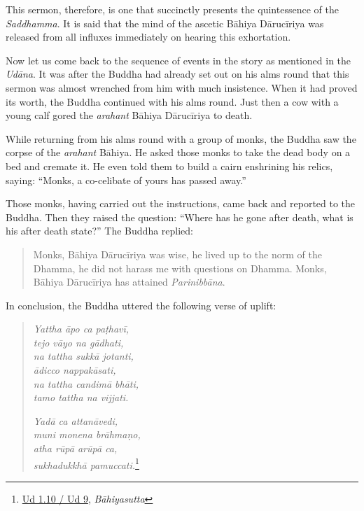 This sermon, therefore, is one that succinctly presents the quintessence of the \emph{Saddhamma}. It is said that the mind of the ascetic Bāhiya Dārucīriya was released from all influxes immediately on hearing this exhortation.

Now let us come back to the sequence of events in the story as mentioned in the \emph{Udāna}. It was after the Buddha had already set out on his alms round that this sermon was almost wrenched from him with much insistence. When it had proved its worth, the Buddha continued with his alms round. Just then a cow with a young calf gored the \emph{arahant} Bāhiya Dārucīriya to death.

While returning from his alms round with a group of monks, the Buddha saw the corpse of the \emph{arahant} Bāhiya. He asked those monks to take the dead body on a bed and cremate it. He even told them to build a cairn enshrining his relics, saying: ``Monks, a co-celibate of yours has passed away.''

Those monks, having carried out the instructions, came back and reported to the Buddha. Then they raised the question: ``Where has he gone after death, what is his after death state?'' The Buddha replied:

\begin{quote}
Monks, Bāhiya Dārucīriya was wise, he lived up to the norm of the Dhamma, he did not harass me with questions on Dhamma. Monks, Bāhiya Dārucīriya has attained \emph{Parinibbāna}.
\end{quote}

In conclusion, the Buddha uttered the following verse of uplift:

\begin{quote}
\emph{Yattha āpo ca paṭhavī,}\\
\emph{tejo vāyo na gādhati,}\\
\emph{na tattha sukkā jotanti,}\\
\emph{ādicco nappakāsati,}\\
\emph{na tattha candimā bhāti,}\\
\emph{tamo tattha na vijjati.}

\emph{Yadā ca attanāvedi,}\\
\emph{muni monena brāhmaṇo,}\\
\emph{atha rūpā arūpā ca,}\\
\emph{sukhadukkhā pamuccati.}\footnote{\href{https://suttacentral.net/ud1.10/pli/ms}{Ud 1.10 / Ud 9}, \emph{Bāhiyasutta}}
\end{quote}

